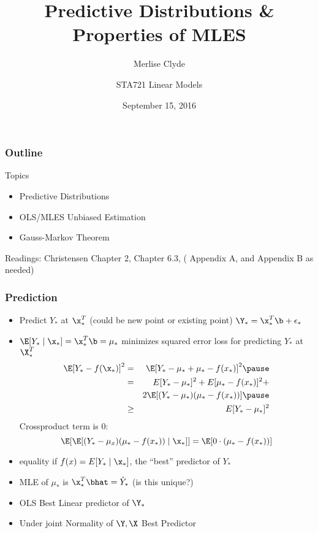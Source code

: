 \documentclass[handout]{beamer}
\title{Predictive Distributions \& Properties of MLES}
\subtitle{Merlise Clyde}
\author{STA721 Linear Models}
\institute{Duke University}
\date{September 15, 2016}
\begin{document}
\maketitle

\begin{frame}\frametitle{Outline}
Topics
  \begin{itemize}
  \item Predictive Distributions
  \item OLS/MLES Unbiased Estimation
  \item Gauss-Markov Theorem
  \end{itemize}


Readings: Christensen Chapter 2,  Chapter 6.3, ( Appendix A, and
Appendix B as needed)
\end{frame}

\begin{frame} \frametitle{Prediction}

  \begin{itemize}
  \item Predict $Y_*$ at $\x_*^T$   (could be new point or existing
    point) $\Y_* = \x_*^T \b + \epsilon_*$ \pause
 \item $\E[Y_* \mid \x_*] = \x_*^{T} \b = \mu_*$ minimizes squared
   error loss for predicting $Y_*$ at $\X_*^T$ \pause
   \begin{eqnarray*}
     \E[Y_* - f(\x_*)]^2 & = & \E[Y_* - \mu_* + \mu_* - f(x_*)]^2
                               \pause \\
 & = & E[Y_* - \mu_*]^2 + E[\mu_* - f(x_*)]^2 + \\  &  & 2\E[( Y_* -
       \mu_*)(\mu_* - f(x_*))] \pause \\
 & \geq & E[Y_* - \mu_*]^2   \end{eqnarray*} \pause
Crossproduct term is 0:  
$$\E[\E[( Y_* -
       \mu_x)(\mu_* - f(x_*))\mid \x_*]] = \E[0 \cdot (\mu_* -
       f(x_*))]$$
\item equality if $f(x) = E[Y_* \mid \x_*]$,  the ``best'' predictor
  of $Y_*$ \pause
\item MLE of $\mu_*$ is $\x_*^{T} \bhat  = \hat{Y}_*$ (is this
  unique?) \pause
\item OLS Best Linear predictor of $\Y_*$
\item Under joint Normality of $\Y, \X$  Best Predictor
  \end{itemize}
\end{frame}
\end{document}
